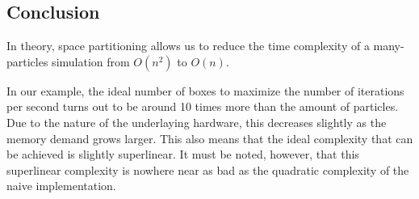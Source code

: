 \subsection{Conclusion}
In theory, space partitioning allows us to reduce the time complexity of a 
many-particles simulation from $O(n^2)$ to $O(n)$.

In our example, the ideal number of boxes to maximize the number of 
iterations per second turns out to be around 10 times more than the amount 
of particles. Due to the nature of the underlaying hardware, this decreases 
slightly as the memory demand grows larger. This also means that the ideal 
complexity that can be achieved is slightly superlinear. It must be noted, 
however, that this superlinear complexity is nowhere near as bad as the 
quadratic complexity of the naive implementation.



